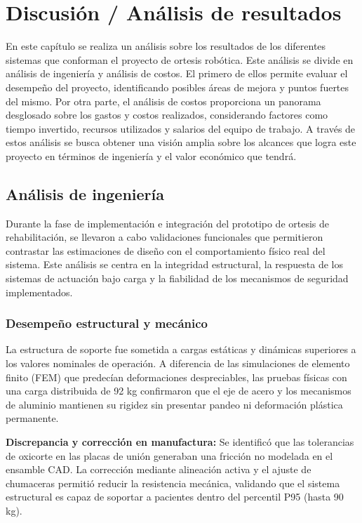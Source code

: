 \chapter{Discusión / Análisis de resultados}
En este capítulo se realiza un análisis sobre los resultados de los diferentes sistemas que conforman el proyecto de ortesis robótica. Este análisis se divide en análisis de ingeniería y análisis de costos. El primero de ellos permite evaluar el desempeño del proyecto, identificando posibles áreas de mejora y puntos fuertes del mismo. Por otra parte, el análisis de costos proporciona un panorama desglosado sobre los gastos y costos realizados, considerando factores como tiempo invertido, recursos utilizados y salarios del equipo de trabajo. A través de estos análisis se busca obtener una visión amplia sobre los alcances que logra este proyecto en términos de ingeniería y el valor económico que tendrá.
\section{Análisis de ingeniería}
\label{sec:analisis_ingenieria}
Durante la fase de implementación e integración del prototipo de ortesis de rehabilitación, se llevaron a cabo validaciones funcionales que permitieron contrastar las estimaciones de diseño con el comportamiento físico real del sistema. Este análisis se centra en la integridad estructural, la respuesta de los sistemas de actuación bajo carga y la fiabilidad de los mecanismos de seguridad implementados.

\subsection{Desempeño estructural y mecánico}
La estructura de soporte fue sometida a cargas estáticas y dinámicas superiores a los valores nominales de operación. A diferencia de las simulaciones de elemento finito (FEM) que predecían deformaciones despreciables, las pruebas físicas con una carga distribuida de 92 kg confirmaron que el eje de acero y los mecanismos de aluminio mantienen su rigidez sin presentar pandeo ni deformación plástica permanente.

\textbf{Discrepancia y corrección en manufactura:}
Se identificó que las tolerancias de oxicorte en las placas de unión generaban una fricción no modelada en el ensamble CAD. La corrección mediante alineación activa y el ajuste de chumaceras permitió reducir la resistencia mecánica, validando que el sistema estructural es capaz de soportar a pacientes dentro del percentil P95 (hasta 90 kg).

